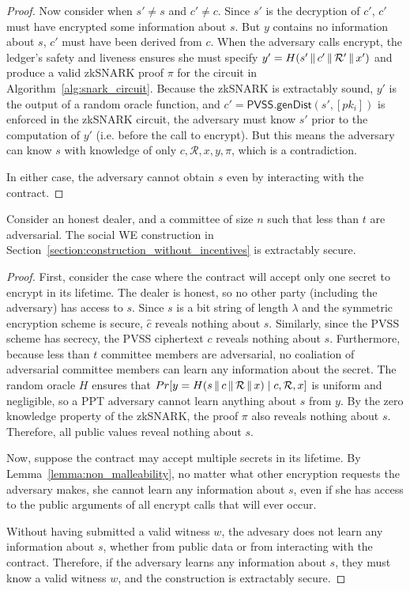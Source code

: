 \begin{proof}
    Now consider when $s' \neq s$ and $c' \neq c$.
    Since $s'$ is the decryption of $c'$, $c'$ must have encrypted some information about $s$.
    But $y$ contains no information about $s$, $c'$ must have been derived from $c$.
    When the adversary calls \textsf{encrypt}, the ledger's safety and liveness ensures she must specify $y' = H(s' \,\|\, c' \,\|\, \mathcal{R}' \,\|\, x')$ and produce a valid zkSNARK proof $\pi$ for the circuit in Algorithm~\ref{alg:snark_circuit}.
    Because the zkSNARK is extractably sound, $y'$ is the output of a random oracle function, and $c' = \textsf{PVSS.genDist}(s', [pk_i])$ is enforced in the zkSNARK circuit,
    the adversary must know $s'$ prior to the computation of $y'$ (i.e. before the call to \textsf{encrypt}).
    But this means the adversary can know $s$ with knowledge of only $c, \mathcal{R}, x, y, \pi$, which is a contradiction.

    In either case, the adversary cannot obtain $s$ even by interacting with the contract.
\end{proof}
\begin{theorem}\label{thm:security_hm}
    Consider an honest dealer, and a committee of size $n$ such that less than $t$ are adversarial.
    The social WE construction in Section~\ref{section:construction_without_incentives} is extractably secure.
\end{theorem}
\begin{proof}
    First, consider the case where the contract will accept only one secret to encrypt in its lifetime.
    The dealer is honest, so no other party (including the adversary) has access to $s$.
    Since $s$ is a bit string of length $\lambda$ and the symmetric encryption scheme is secure, $\hat{c}$ reveals nothing about $s$.
    Similarly, since the PVSS scheme has secrecy, the PVSS ciphertext $c$ reveals nothing about $s$.
    Furthermore, because less than $t$ committee members are adversarial, no coaliation of adversarial committee members can learn any information about the secret.
    The random oracle $H$ ensures that $Pr[ y = H(s \,\|\, c \,\|\, \mathcal{R} \,\|\, x) \mid c, \mathcal{R}, x ]$ is uniform and negligible, so a PPT adversary cannot learn anything about $s$ from $y$.
    By the zero knowledge property of the zkSNARK, the proof $\pi$ also reveals nothing about $s$.
    Therefore, all public values reveal nothing about $s$.

    Now, suppose the contract may accept multiple secrets in its lifetime.
    By Lemma~\ref{lemma:non_malleability}, no matter what other encryption requests the adversary makes, she cannot learn any information about $s$, even if she has access to the public arguments of all \textsf{encrypt} calls that will ever occur.

    Without having submitted a valid witness $w$, the advesary does not learn any information about $s$, whether from public data or from interacting with the contract.
    Therefore, if the adversary learns any information about $s$, they must know a valid witness $w$, and the construction is extractably secure.
\end{proof}